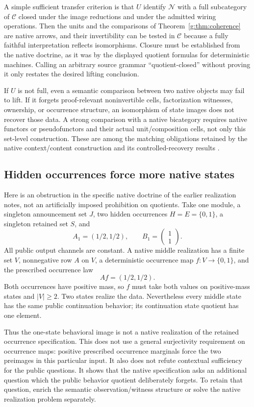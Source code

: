 \documentclass[11pt]{article}
\theoremstyle{definition}
\theoremstyle{remark}\newtheorem{remark}[theorem]{Remark}
\newcommand{\C}{\mathcal C}
\newcommand{\N}{\mathcal N}
\begin{document}
A simple sufficient transfer criterion is that $U$ identify $\N$ with a
full subcategory of $\C$ closed under the image reductions and under the
admitted wiring operations. Then the units and the comparisons of
Theorem~\ref{g:thm:coherence} are native arrows, and their invertibility
can be tested in $\C$ because a fully faithful interpretation reflects
isomorphisms. Closure must be established from the native doctrine, as
it was by the displayed quotient formulas for deterministic machines.
Calling an arbitrary source grammar ``quotient-closed'' without proving
it only restates the desired lifting conclusion.

If $U$ is not full, even a semantic comparison between two native objects
may fail to lift. If it forgets proof-relevant noninvertible cells,
factorization witnesses, ownership, or occurrence structure, an
isomorphism of state images does not recover those data. A strong
comparison with a native bicategory requires native functors or
pseudofunctors and their actual unit/composition cells, not only this
set-level construction. These are among the matching obligations retained by the native
context/content construction and its controlled-recovery results
\cite{RelativeNote,RecoveryNote}.

\subsection{Hidden occurrences force more native states}
Here is an obstruction in the specific native doctrine of the earlier
realization notes, not an artificially imposed prohibition on quotients.
Take one module, a singleton announcement set $J$, two hidden occurrences
$H=E=\{0,1\}$, a singleton retained set $S$, and
\[
 A_1=(1/2,1/2),\qquad B_1=\begin{pmatrix}1\\1\end{pmatrix}.
\]
All public output channels are constant. A native middle realization has
a finite set $V$, nonnegative row $A$ on $V$, a deterministic occurrence
map $f:V\to\{0,1\}$, and the prescribed occurrence law
\[
 Af=(1/2,1/2).
\]
Both occurrences have positive mass, so $f$ must take both values on
positive-mass states and $|V|\ge2$. Two states realize the data.
Nevertheless every middle state has the same public continuation
behavior; its continuation state quotient has one element.

Thus the one-state behavioral image is not a native realization of the
retained occurrence specification. This does not use a general
surjectivity requirement on occurrence maps: positive prescribed
occurrence marginals force the two preimages in this particular input.
It also does not refute contextual sufficiency for the public questions.
It shows that the native specification asks an additional question which
the public behavior quotient deliberately forgets. To retain that
question, enrich the semantic observation/witness structure or solve the
native realization problem separately.
\end{document}
